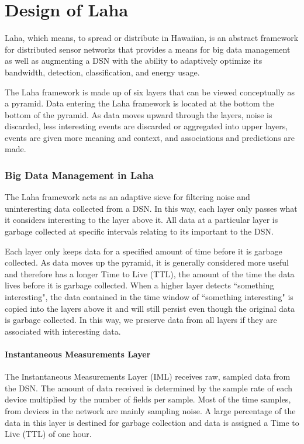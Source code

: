 \chapter{Design of Laha}

Laha, which means, to spread or distribute in Hawaiian, is an abstract framework for distributed sensor networks that provides a means for big data management as well as augmenting a DSN with the ability to adaptively optimize its bandwidth, detection, classification, and energy usage.

The Laha framework is made up of six layers that can be viewed conceptually as a pyramid. Data entering the Laha framework is located at the bottom the bottom of the pyramid. As data moves upward through the layers, noise is discarded, less interesting events are discarded or aggregated into upper layers, events are given more meaning and context, and associations and predictions are made. 

\subsection{Big Data Management in Laha} \label{big-data-management}
The Laha framework acts as an adaptive sieve for filtering noise and uninteresting data collected from a DSN. In this way, each layer only passes what it considers interesting to the layer above it. All data at a particular layer is garbage collected at specific intervals relating to its important to the DSN.

Each layer only keeps data for a specified amount of time before it is garbage collected. As data moves up the pyramid, it is generally considered more useful and therefore has a longer Time to Live (TTL), the amount of the time the data lives before it is garbage collected.  When a higher layer detects ``something interesting", the data contained in the time window of ``something interesting" is copied into the layers above it and will still persist even though the original data is garbage collected. In this way, we preserve data from all layers if they are associated with interesting data. 

\subsubsection{Instantaneous Measurements Layer}
The Instantaneous Measurements Layer (IML) receives raw, sampled data from the DSN. The amount of data received is determined by the sample rate of each device multiplied by the number of fields per sample. Most of the time samples, from devices in the network are mainly sampling noise. A large percentage of the data in this layer is destined for garbage collection and data is assigned a Time to Live (TTL) of one hour. 


